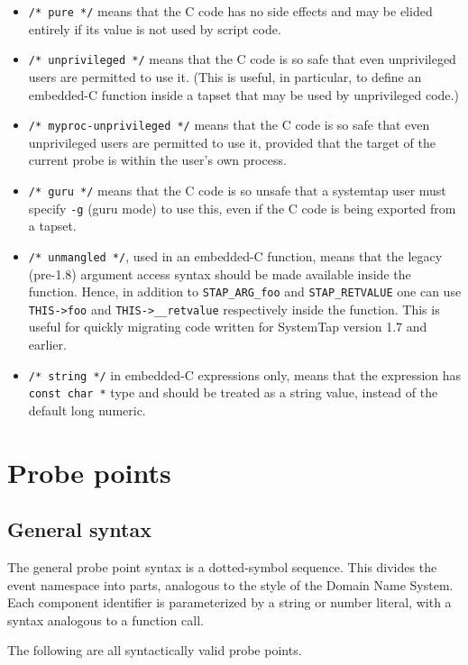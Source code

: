 \documentclass[twoside,english]{article}
\begin{document}
\begin{itemize}
\item \verb+/* pure */+ means that the C code has no side effects and
  may be elided entirely if its value is not used by script code.
\item \verb+/* unprivileged */+ means that the C code is so safe that
  even unprivileged users are permitted to use it. (This is useful, in
  particular, to define an embedded-C function inside a tapset that
  may be used by unprivileged code.)
\item \verb+/* myproc-unprivileged */+ means that the C code is so
  safe that even unprivileged users are permitted to use it, provided
  that the target of the current probe is within the user's own
  process.
\item \verb+/* guru */+ means that the C code is so unsafe that a
  systemtap user must specify \verb+-g+ (guru mode) to use this, even
  if the C code is being exported from a tapset.
\item \verb+/* unmangled */+, used in an embedded-C function, means
  that the legacy (pre-1.8) argument access syntax should be made
  available inside the function. Hence, in addition to
  \verb+STAP_ARG_foo+ and \verb+STAP_RETVALUE+ one can use
  \verb+THIS->foo+ and \verb+THIS->__retvalue+ respectively inside the
  function. This is useful for quickly migrating code written for
  SystemTap version 1.7 and earlier.
\item \verb+/* string */+ in embedded-C expressions only, means that
  the expression has \verb+const char *+ type and should be treated as
  a string value, instead of the default long numeric.
\end{itemize}

\section{Probe points\label{sec:Probe-Points}}
\subsection{General syntax}
The general probe point syntax is a dotted-symbol sequence. This divides
the event namespace into parts, analogous to the style of the Domain Name
System. Each component identifier is parameterized by a string or number
literal, with a syntax analogous to a function call.

The following are all syntactically valid probe points.
\end{document}
